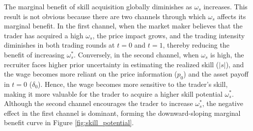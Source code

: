 
The marginal benefit of skill acquisition globally diminishes as $\omega_{s}$ increases. This result is not obvious because there are two channels through which $\omega_{s}$ affects its marginal benefit. In the first channel, when the market maker believes that the trader has acquired a high $\omega_{s}$, the price impact grows, and the trading intensity diminishes in both trading rounds at $t=0$ and $t=1$, thereby reducing the benefit of increasing $\omega_{s}^{\ast}$. Conversely, in the second channel, when $\omega_{s}$ is high, the recruiter faces higher prior uncertainty in estimating the realized skill ($|s|$), and the wage becomes more reliant on the price information ($p_{0}$) and the asset payoff in $t=0$ ($\delta_{0}$). Hence, the wage becomes more sensitive to the trader's skill, making it more valuable for the trader to acquire a higher skill potential $\omega_{s}^{\ast}$. Although the second channel encourages the trader to increase $\omega_{s}^{*}$, the negative effect in the first channel is dominant, forming the downward-sloping marginal benefit curve in Figure \ref{fig:skill_potential}.

